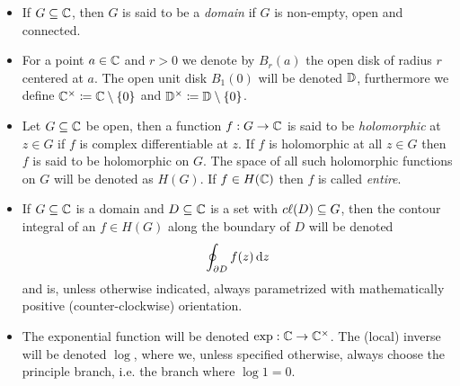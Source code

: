 \begin{itemize}[label=$\rightsquigarrow$]
    \item If $G \subseteq \mathbb{C}$, then $G$ is said to be a \emph{domain} if $G$ is non-empty, open and connected.
    \item For a point $a \in \mathbb{C}$ and $r > 0$ we denote by $B_r(a)$ the open disk of radius $r$ centered at $a$. The open unit disk $B_1(0)$ will be denoted $\mathbb{D}$, furthermore we define $\mathbb{C}^\times \coloneqq \mathbb{C} \setminus \{ 0 \}$ and $\mathbb{D}^\times \coloneqq \mathbb{D} \setminus \{ 0 \}$.
    \item Let $G \subseteq \mathbb{C}$ be open, then a function $f : G \to \mathbb{C}$ is said to be \emph{holomorphic} at $z \in G$ if $f$ is complex differentiable at $z$. If $f$ is holomorphic at all $z \in G$ then $f$ is said to be holomorphic on $G$. The space of all such holomorphic functions on $G$ will be denoted as $H(G)$. If $f \in H(\mathbb{C})$ then $f$ is called \emph{entire}.
    \item If $G \subseteq \mathbb{C}$ is a domain and $D \subseteq \mathbb{C}$ is a set with $c\ell({D}) \subseteq G$, then the contour integral of an $f \in H(G)$ along the boundary of $D$ will be denoted
    $$ \oint_{\partial D} f(z) \mathop{}\!\mathrm{d} z $$
    and is, unless otherwise indicated, always parametrized with mathematically positive (counter-clockwise) orientation.
    \item The exponential function will be denoted $\exp : \mathbb{C} \to \mathbb{C}^\times$. The (local) inverse will be denoted $\log$, where we, unless specified otherwise, always choose the principle branch, i.e. the branch where $\log 1 = 0$.
\end{itemize}

